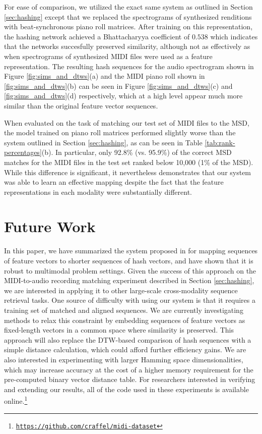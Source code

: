 \documentclass{article} %
\begin{document}
For ease of comparison, we utilized the exact same system as outlined in Section \ref{sec:hashing} except that we replaced the spectrograms of synthesized renditions with beat-synchronous piano roll matrices.
After training on this representation, the hashing network achieved a Bhattacharyya coefficient of $0.538$ which indicates that the networks succesfully preserved similarity, although not as effectively as when spectrograms of synthesized MIDI files were used as a feature representation.
The resulting hash sequences for the audio spectrogram shown in Figure \ref{fig:sims_and_dtws}(a) and the MIDI piano roll shown in \ref{fig:sims_and_dtws}(b) can be seen in Figure \ref{fig:sims_and_dtws}(c) and \ref{fig:sims_and_dtws}(d) respectively, which at a high level appear much more similar than the original feature vector sequences.

When evaluated on the task of matching our test set of MIDI files to the MSD, the model trained on piano roll matrices performed slightly worse than the system outlined in Section \ref{sec:hashing}, as can be seen in Table \ref{tab:rank-percentages}(b).
In particular, only 92.8\% (vs. 95.9\%) of the correct MSD matches for the MIDI files in the test set ranked below 10,000 (1\% of the MSD).
While this difference is significant, it nevertheless demonstrates that our system was able to learn an effective mapping despite the fact that the feature representations in each modality were substantially different.

\section{Future Work}

In this paper, we have summarized the system proposed in \cite{raffel2015large} for mapping sequences of feature vectors to shorter sequences of hash vectors, and have shown that it is robust to multimodal problem settings.
Given the success of this approach on the MIDI-to-audio recording matching experiment described in Section \ref{sec:hashing}, we are interested in applying it to other large-scale cross-modality sequence retrieval tasks.
One source of difficulty with using our system is that it requires a training set of matched and aligned sequences.
We are currently investigating methods to relax this constraint by embedding sequences of feature vectors as fixed-length vectors in a common space where similarity is preserved.
This approach will also replace the DTW-based comparison of hash sequences with a simple distance calculation, which could afford further efficiency gains.
We are also interested in experimenting with larger Hamming space dimensionalities, which may increase accuracy at the cost of a higher memory requirement for the pre-computed binary vector distance table.
For researchers interested in verifying and extending our results, all of the code used in these experiments is available online.\footnote{\href{https://github.com/craffel/midi-dataset}{\texttt{https://github.com/craffel/midi-dataset}}}


\small

\end{document}
